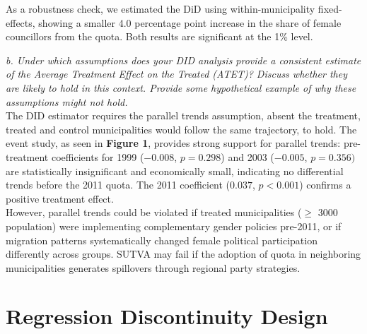 \documentclass[12pt]{article}
\begin{document}
As a robustness check, we estimated the DiD using within-municipality fixed-effects, showing a smaller 4.0 percentage point increase in the share of female councillors from the quota. Both results are significant at the 1\% level. \\
\begin{table}[H]
    \centering
    \caption{DiD estimates of quota effect on share of female councillors (2011)}
\end{table}

\noindent
\textit{b. Under which assumptions does your DID analysis provide a consistent estimate of the Average Treatment Effect on the Treated (ATET)? Discuss whether they are likely to hold in this context. Provide some hypothetical example of why these assumptions might not hold.} \\


The DID estimator requires the parallel trends assumption, absent  the treatment, treated and control municipalities would follow the same trajectory, to hold. The event study, as seen in \textbf{Figure 1}, provides strong support for parallel trends: pre-treatment coefficients for 1999 ($-0.008$, $p=0.298$) and 2003 ($-0.005$, $p=0.356)$ are statistically insignificant and economically small, indicating no differential trends before the 2011 quota. The 2011 coefficient ($0.037$, $p<0.001$) confirms a positive treatment effect. \\

However, parallel trends could be violated if treated municipalities ($\geq$ 3000 population) were implementing complementary gender policies pre-2011, or if migration patterns systematically changed female political participation differently across groups. SUTVA may fail if the adoption of quota in neighboring municipalities generates spillovers through regional party strategies.

\section{Regression Discontinuity Design}
\end{document}
